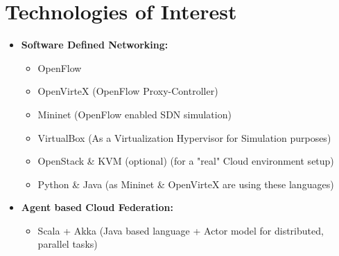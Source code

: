 \documentclass[a4paper,10pt]{article}
\begin{document}
\section{Technologies of Interest}
\begin{itemize}
	\item{\textbf{Software Defined Networking:}}
	\begin{itemize}
		\item OpenFlow
		\item OpenVirteX (OpenFlow Proxy-Controller)
		\item Mininet (OpenFlow enabled SDN simulation)
		\item VirtualBox (As a Virtualization Hypervisor for Simulation purposes)
		\item OpenStack \& KVM (optional) (for a "real" Cloud environment setup)
		\item Python \& Java (as Mininet \& OpenVirteX are using these languages)
	\end{itemize}
	\item{\textbf{Agent based Cloud Federation:}}
	\begin{itemize}
		\item Scala + Akka (Java based language + Actor model for distributed, parallel tasks)
	\end{itemize}
\end{itemize}
\end{document}
